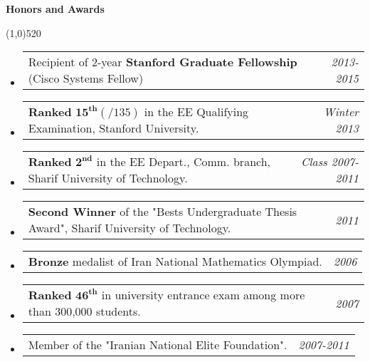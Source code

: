 \documentclass[letterpaper,10pt]{article}
\makeatletter
\newcommand{\heading}[1] {
  {\large
    \begin{minipage}
    {\textwidth}
    {\textbf{#1}}
    \end{minipage}
  }
  \begin{center}
  \vspace{-15pt}
  \line(1,0){520}
  \end{center}
}
\newcommand{\template}[2]{
\begin{tabular*}{7.0in}{l@{\extracolsep{\fill}}r}
		#1 & \textit{#2} \\
\end{tabular*}\vspace{-1pt}}
\makeatother
\begin{document}



%
%
%
%
%
%



\heading{Honors and Awards}
\begin{itemize}
\item  \template{Recipient of 2-year \textbf {Stanford Graduate Fellowship} (Cisco Systems Fellow)}{2013-2015}
\item  \template{\textbf{Ranked} $\mathbf{15^{th}}(/135)$ in the EE Qualifying Examination, Stanford University.}{Winter 2013}
\item  \template{\textbf{Ranked} $\mathbf{2^{nd}}$ in the EE Depart., Comm. branch, Sharif University of Technology.}{Class 2007-2011}

\item \template{ \textbf{Second Winner} of the "Bests Undergraduate Thesis Award", Sharif University of Technology.}{2011}


\item \template{\textbf{Bronze} medalist of Iran National Mathematics Olympiad.}{2006}

\item \template{\textbf{Ranked} $\mathbf{46^{th}}$ in university entrance exam among more than 300,000 students.}{2007}

\item \template{Member of the "Iranian National Elite Foundation".}{2007-2011} 

\end{itemize}
\end{document}

